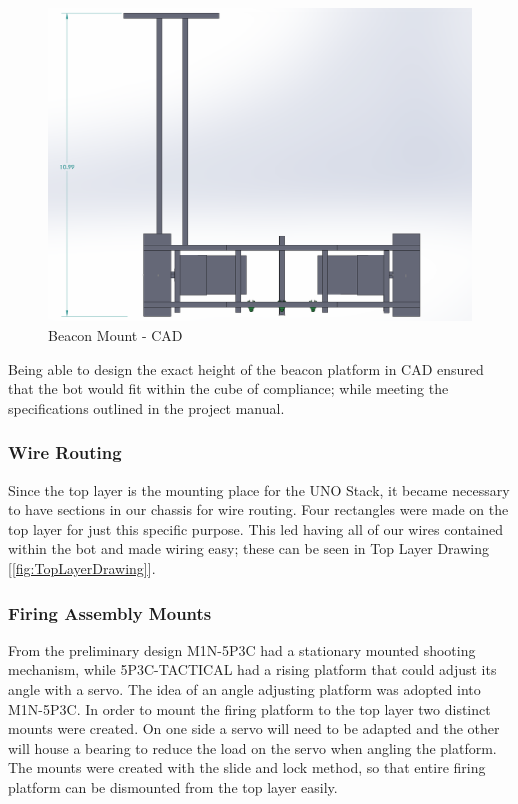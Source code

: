 \documentclass{article}
\begin{document}
\begin{figure}[H]
    \centering
    \includegraphics[width = 5in]{BeaconMount.PNG}
    \caption{Beacon Mount - CAD}
    \label{fig:BeaconMountCAD}
\end{figure}

Being able to design the exact height of the beacon platform in CAD ensured that the bot would fit within the cube of compliance; while meeting the specifications outlined in the project manual.

\subsubsection{Wire Routing}
Since the top layer is the mounting place for the UNO Stack, it became necessary to have sections in our chassis for wire routing. Four rectangles were made on the top layer for just this specific purpose. This led having all of our wires contained within the bot and made wiring easy; these can be seen in Top Layer Drawing [\ref{fig:TopLayerDrawing}].

\subsubsection{Firing Assembly Mounts}
From the preliminary design M1N-5P3C had a stationary mounted shooting mechanism, while 5P3C-TACTICAL had a rising platform that could adjust its angle with a servo. The idea of an angle adjusting platform was adopted into M1N-5P3C. In order to mount the firing platform to the top layer two distinct mounts were created. On one side a servo will need to be adapted and the other will house a bearing to reduce the load on the servo when angling the platform. The mounts were created with the slide and lock method, so that entire firing platform can be dismounted from the top layer easily.
\end{document}
